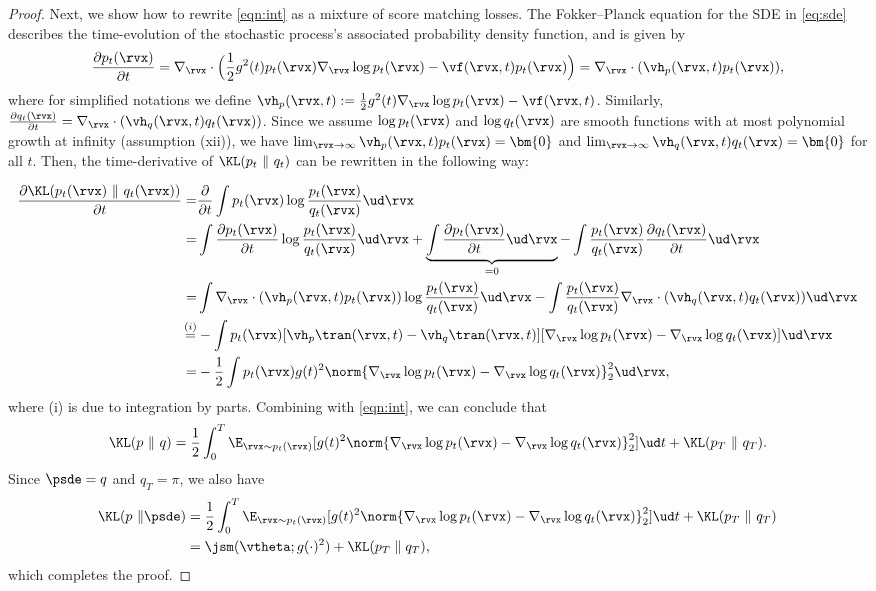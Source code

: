 \begin{proof}
Next, we show how to rewrite \cref{eqn:int} as a mixture of score matching losses. 
The Fokker--Planck equation for the SDE in \cref{eq:sde} describes the time-evolution of the stochastic process's associated probability density function, and is given by
\begin{align*}
    \frac{\partial p_t(\rvx)}{\partial t} = \nabla_\rvx \cdot \Big( \frac{1}{2} g^2(t) p_t(\rvx) \nabla_{\rvx} \log p_t(\rvx) - \vf(\rvx,t) p_t(\rvx) \Big) = \nabla_{\rvx} \cdot (\vh_p(\rvx, t) p_t(\rvx)),
\end{align*}
where for simplified notations we define $\vh_p(\rvx, t) := \frac{1}{2}g^2(t) \nabla_{\rvx} \log p_t(\rvx) - \vf(\rvx, t)$. Similarly, $\frac{\partial q_t(\rvx)}{\partial t} = \nabla_{\rvx} \cdot (\vh_q(\rvx, t) q_t(\rvx))$. Since we assume $\log p_t(\rvx)$ and $\log q_t(\rvx)$ are smooth functions with at most polynomial growth at infinity (assumption (xii)), we have $\lim_{\rvx \to \infty} \vh_p(\rvx, t)p_t(\rvx) = \bm{0}$ and $\lim_{\rvx \to \infty}\vh_q(\rvx, t)q_t(\rvx) = \bm{0}$ for all $t$. Then, the time-derivative of $\KL(p_t~\|~q_t)$ can be rewritten in the following way:

\begin{align*}
    \frac{\partial \KL(p_t(\rvx)~\|~q_t(\rvx))}{\partial t}  =& \frac{\partial}{\partial t}\int p_t(\rvx) \log \frac{p_t(\rvx)}{q_t(\rvx)} \ud \rvx\\\
    =&\int \frac{\partial p_t(\rvx)}{\partial t} \log \frac{p_t(\rvx)}{q_t(\rvx)} \ud \rvx + \underbrace{\int \frac{\partial p_t(\rvx)}{\partial t} \ud \rvx}_{=0} - \int \frac{p_t(\rvx)}{q_t(\rvx)} \frac{\partial q_t(\rvx)}{\partial t} \ud \rvx\\
    =& \int \nabla_{\rvx} \cdot (\vh_p(\rvx, t) p_t(\rvx)) \log \frac{p_t(\rvx)}{q_t(\rvx)} \ud \rvx -\int \frac{p_t(\rvx)}{q_t(\rvx)}\nabla_{\rvx} \cdot (\vh_q(\rvx, t) q_t(\rvx))  \ud \rvx\\
    \stackrel{(i)}{=}& -\int p_t(\rvx)[\vh_p\tran(\rvx, t) - \vh_q\tran(\rvx, t)][\nabla_\rvx \log p_t(\rvx) - \nabla_\rvx \log q_t(\rvx)] \ud \rvx \\
    =& -\frac{1}{2} \int p_t(\rvx) g(t)^2 \norm{\nabla_\rvx \log p_t(\rvx) - \nabla_\rvx \log q_t(\rvx)}_2^2 \ud \rvx,
\end{align*}
where (i) is due to integration by parts. Combining with \cref{eqn:int}, we can conclude that
\begin{align}
   \KL(p~\|~q) = \frac{1}{2}\int_0^T \E_{\rvx \sim p_t(\rvx)}[g(t)^2 \norm{\nabla_\rvx \log p_t(\rvx) - \nabla_\rvx \log q_t(\rvx)}_2^2] \ud t + \KL(p_T~\|~q_T). 
\end{align}
Since $\psde = q$ and $q_T = \pi$, we also have
\begin{align}
   \KL(p~\|\psde) &= \frac{1}{2}\int_0^T \E_{\rvx \sim p_t(\rvx)}[g(t)^2 \norm{\nabla_\rvx \log p_t(\rvx) - \nabla_\rvx \log q_t(\rvx)}_2^2] \ud t + \KL(p_T~\|~q_T)\notag\\
   &= \jsm(\vtheta; g(\cdot)^2) + \KL(p_T\mathrel\| q_T),
\end{align}
which completes the proof.
\end{proof}



